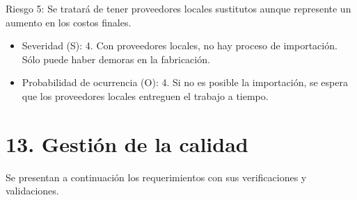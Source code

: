 \documentclass[11pt]{charter}
\begin{document}
Riesgo 5:  Se tratará de tener  proveedores locales sustitutos aunque represente un aumento en los costos finales. 
\begin{itemize}
\item Severidad (S): 4. Con proveedores locales, no hay proceso de importación. Sólo puede haber demoras en la fabricación.
\item Probabilidad de ocurrencia (O): 4. Si no es posible la importación, se espera que los proveedores locales entreguen el trabajo a tiempo.
\end{itemize}



\section{13. Gestión de la calidad}
\label{sec:calidad}


Se presentan a continuación los requerimientos con sus verificaciones y validaciones.
\end{document}
